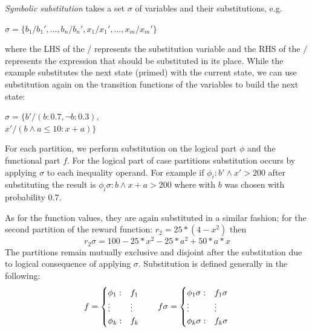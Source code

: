 \documentclass[letterpaper]{article}
\begin{document}
\emph{Symbolic substitution} takes a set $\sigma$ of variables and their substitutions, e.g.
 
{\footnotesize
\begin{center}
$\sigma = \{ b_1 / b_1', \ldots, b_n / b_n', x_1 / x_1', \ldots, x_m / x_m' \}$ 
\end{center}
}
where the LHS of the $/$ represents the substitution variable and the RHS of the $/$ represents 
the expression that should be substituted in its place.
While the example substitutes the next state (primed) with the current state, we can use substitution again on the transition functions of the variables to build the next state:
{\footnotesize
\begin{center}
 $\sigma = \{ b'/(b:0.7,\neg b:0.3),$\\$ x'/(b \wedge a\leq 10: x + a ) \}$
\end{center}
}
For each partition, we perform substitution on the logical part $\phi$ and the functional part $f$. For the logical part of case partitions substitution occurs by applying $\sigma$ to each inequality operand. For example if $\phi_i: b' \wedge x'>200$ after substituting the result is $\phi_i\sigma : b \wedge x + a > 200 $ where with $b$ was chosen with probability 0.7. 

As for the function values, they are again substituted in a similar fashion; for the second partition of the reward function:  $r_2 = 25 * (4 - x^2)$  then  
\begin{equation}
r_2\sigma = 100 - 25*x^2 - 25* a^{2} + 50*a*x 
\end{equation}
The partitions remain mutually exclusive and disjoint after the substitution due to logical consequence of applying $\sigma$. Substitution is defined generally in the following:
{\footnotesize
\begin{equation}
\begin{tabular}{r c c l}
&
\hspace{-6mm} 
  $f = \begin{cases}
    \phi_1: & f_1 \\ 
   \vdots&\vdots \\ 
    \phi_k: & f_k \\ 
  \end{cases}$
&

&
\hspace{-2mm}
  $f\sigma = \begin{cases}
    \phi_1\sigma: & f_1\sigma \\ 
   \vdots&\vdots \\ 
    \phi_k\sigma: & f_k\sigma \\ 
  \end{cases}$
\end{tabular}
\end{equation}
}
\end{document}
